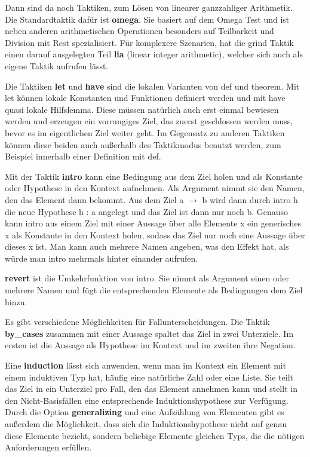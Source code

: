 Dann sind da noch Taktiken, zum Lösen von linearer ganzzahliger Arithmetik.
Die Standardtaktik dafür ist \textbf{omega}.
Sie basiert auf dem Omega Test\cite{10.1145/125826.125848} und ist neben anderen arithmetischen Operationen besonders auf Teilbarkeit und Division mit Rest spezialisiert.
Für komplexere Szenarien, hat die grind Taktik einen darauf ausgelegten Teil \textbf{lia} (linear integer arithmetic), welcher sich auch als eigene Taktik aufrufen lässt.

Die Taktiken \textbf{let} und \textbf{have} sind die lokalen Varianten von def und theorem. 
Mit let können lokale Konstanten und Funktionen definiert werden und mit have quasi lokale Hilfslemma.
Diese müssen natürlich auch erst einmal bewiesen werden und erzeugen ein vorrangiges Ziel, das zuerst geschlossen werden muss, bevor es im eigentlichen Ziel weiter geht.
Im Gegensatz zu anderen Taktiken können diese beiden auch außerhalb des Taktikmodus benutzt werden, zum Beispiel innerhalb einer Definition mit def.

Mit der Taktik \textbf{intro} kann eine Bedingung aus dem Ziel holen und als Konstante oder Hypothese in den Kontext aufnehmen.
Als Argument nimmt sie den Namen, den das Element dann bekommt.
Aus dem Ziel a $\rightarrow$ b wird dann durch intro h die neue Hypothese h : a angelegt und das Ziel ist dann nur noch b.
Genauso kann intro aus einem Ziel mit einer Aussage über alle Elemente x ein generisches x als Konstante in den Kontext holen, sodass das Ziel nur noch eine Aussage über dieses x ist.
Man kann auch mehrere Namen angeben, was den Effekt hat, als würde man intro mehrmals hinter einander aufrufen.

\textbf{revert} ist die Umkehrfunktion von intro.
Sie nimmt als Argument einen oder mehrere Namen und fügt die entsprechenden Elemente als Bedingungen dem Ziel hinzu.

Es gibt verschiedene Möglichkeiten für Fallunterscheidungen.
Die Taktik \textbf{by\-\_cases} zusammen mit einer Aussage spaltet das Ziel in zwei Unterziele.
Im ersten ist die Aussage als Hypothese im Kontext und im zweiten ihre Negation.

Eine \textbf{induction} lässt sich anwenden, wenn man im Kontext ein Element mit einem induktiven Typ hat,
häufig eine natürliche Zahl oder eine Liste.
Sie teilt das Ziel in ein Unterziel pro Fall, den das Element annehmen kann und stellt in den Nicht-Basisfällen eine entsprechende Induktionshypothese zur Verfügung.
Durch die Option \textbf{generalizing} und eine Aufzählung von Elementen gibt es außerdem die Möglichkeit, dass sich die Induktionshypothese nicht auf genau diese Elemente bezieht,
sondern beliebige Elemente gleichen Typs, die die nötigen Anforderungen erfüllen.

